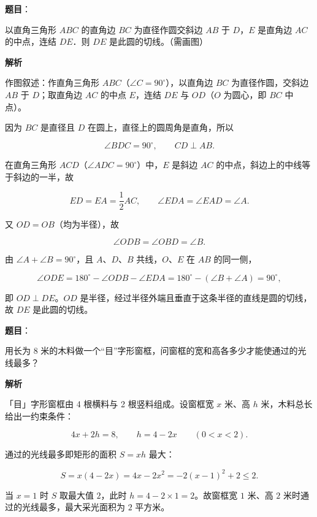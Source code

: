 \begin{answer}

\textbf{题目}：

以直角三角形 $ABC$ 的直角边 $BC$ 为直径作圆交斜边 $AB$ 于 $D$，$E$ 是直角边 $AC$ 的中点，连结 $DE$．则 $DE$ 是此圆的切线。（需画图）

\textbf{解析}

作图叙述：作直角三角形 $ABC$（$\angle C=90^{\circ}$），以直角边 $BC$ 为直径作圆，交斜边 $AB$ 于 $D$；取直角边 $AC$ 的中点 $E$，连结 $DE$ 与 $OD$（$O$ 为圆心，即 $BC$ 中点）。

因为 $BC$ 是直径且 $D$ 在圆上，直径上的圆周角是直角，所以

\nopagebreak[4]
\[
\angle BDC=90^{\circ},
\qquad
CD\perp AB.
\]

在直角三角形 $ACD$（$\angle ADC=90^{\circ}$）中，$E$ 是斜边 $AC$ 的中点，斜边上的中线等于斜边的一半，故

\nopagebreak[4]
\[
ED=EA=\frac{1}{2}AC,
\qquad
\angle EDA=\angle EAD=\angle A.
\]

又 $OD=OB$（均为半径），故

\nopagebreak[4]
\[
\angle ODB=\angle OBD=\angle B.
\]

由 $\angle A+\angle B=90^{\circ}$，且 $A\text{、}D\text{、}B$ 共线，$O\text{、}E$ 在 $AB$ 的同一侧，

\nopagebreak[4]
\[
\angle ODE=180^{\circ}-\angle ODB-\angle EDA=180^{\circ}-(\angle B+\angle A)=90^{\circ},
\]

即 $OD\perp DE$。$OD$ 是半径，经过半径外端且垂直于这条半径的直线是圆的切线，故 $DE$ 是此圆的切线。


\end{answer}
\begin{answer}

\textbf{题目}：

用长为 8 米的木料做一个“目”字形窗框，问窗框的宽和高各多少才能使通过的光线最多？

\textbf{解析}

「目」字形窗框由 4 根横料与 2 根竖料组成。设窗框宽 $x$ 米、高 $h$ 米，木料总长给出一约束条件：

\nopagebreak[4]
\[
4x+2h=8,
\qquad
h=4-2x
\qquad
(0<x<2).
\]

通过的光线最多即矩形的面积 $S=xh$ 最大：

\nopagebreak[4]
\[
S=x(4-2x)=4x-2x^{2}=-2(x-1)^{2}+2\le2.
\]

当 $x=1$ 时 $S$ 取最大值 $2$，此时 $h=4-2\times1=2$。故窗框宽 $1$ 米、高 $2$ 米时通过的光线最多，最大采光面积为 $2$ 平方米。


\end{answer}
